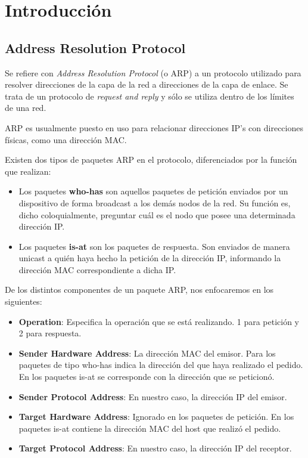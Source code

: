 \section{Introducción}

\subsection{Address Resolution Protocol}

Se refiere con \textit{Address Resolution Protocol} (o ARP) a un protocolo utilizado para resolver direcciones de la capa de la red a direcciones de la capa de enlace. Se trata de un protocolo de \textit{request and reply} y sólo se utiliza dentro de los límites de una red.\newline

ARP es usualmente puesto en uso para relacionar direcciones IP's con direcciones físicas, como una dirección MAC.\newline

Existen dos tipos de paquetes ARP en el protocolo, diferenciados por la función que realizan: 

\begin{itemize}
    \item Los paquetes \textbf{who-has} son aquellos paquetes de petición enviados por un dispositivo de forma broadcast a los demás nodos de la red. Su función es, dicho coloquialmente, preguntar cuál es el nodo que posee una determinada dirección IP.
    \item Los paquetes \textbf{is-at} son los paquetes de respuesta. Son enviados de manera unicast a quién haya hecho la petición de la dirección IP, informando la dirección MAC correspondiente a dicha IP. 
\end{itemize}

De los distintos componentes de un paquete ARP, nos enfocaremos en los siguientes:

\begin{itemize}
    \item \textbf{Operation}: Especifica la operación que se está realizando. 1 para petición y 2 para respuesta.
    \item \textbf{Sender Hardware Address}: La dirección MAC del emisor. Para los paquetes de tipo who-has indica la dirección del que haya realizado el pedido. En los paquetes is-at se corresponde con la dirección que se peticionó.
    \item \textbf{Sender Protocol Address}: En nuestro caso, la dirección IP del emisor.
    \item \textbf{Target Hardware Address}: Ignorado en los paquetes de petición. En los paquetes is-at contiene la dirección MAC del host que realizó el pedido.
    \item \textbf{Target Protocol Address}: En nuestro caso, la dirección IP del receptor.
\end{itemize}

